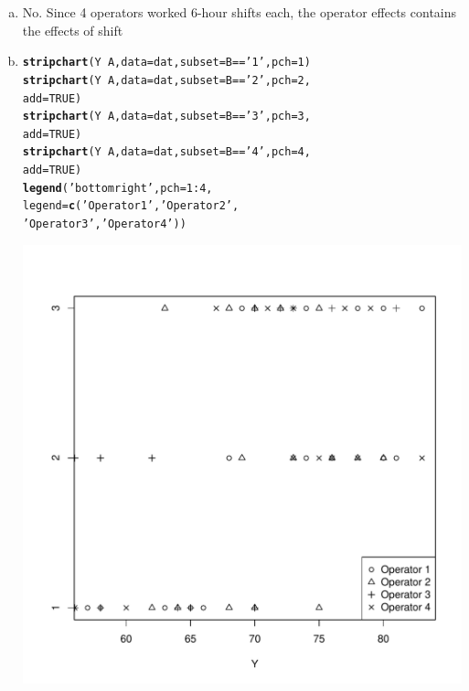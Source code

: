 \documentclass{article}\usepackage[]{graphicx}\usepackage[]{color}
\makeatletter
\def\maxwidth{ %
  \ifdim\Gin@nat@width>\linewidth
    \linewidth
  \else
    \Gin@nat@width
  \fi
}
\newcommand{\hlnum}[1]{\textcolor[rgb]{0.686,0.059,0.569}{#1}}%
\newcommand{\hlstr}[1]{\textcolor[rgb]{0.192,0.494,0.8}{#1}}%
\newcommand{\hlopt}[1]{\textcolor[rgb]{0,0,0}{#1}}%
\newcommand{\hlstd}[1]{\textcolor[rgb]{0.345,0.345,0.345}{#1}}%
\newcommand{\hlkwc}[1]{\textcolor[rgb]{0.333,0.667,0.333}{#1}}%
\newcommand{\hlkwd}[1]{\textcolor[rgb]{0.737,0.353,0.396}{\textbf{#1}}}%
\newenvironment{kframe}{%
 \def\at@end@of@kframe{}%
 \ifinner\ifhmode%
  \def\at@end@of@kframe{\end{minipage}}%
  \begin{minipage}{\columnwidth}%
 \fi\fi%
 \def\FrameCommand##1{\hskip\@totalleftmargin \hskip-\fboxsep
 \colorbox{shadecolor}{##1}\hskip-\fboxsep
     \hskip-\linewidth \hskip-\@totalleftmargin \hskip\columnwidth}%
 \MakeFramed {\advance\hsize-\width
   \@totalleftmargin\z@ \linewidth\hsize
   \@setminipage}}%
 {\par\unskip\endMakeFramed%
 \at@end@of@kframe}
\newenvironment{knitrout}{}{} %
\makeatother
\begin{document}
\begin{enumerate}[(a)]

\item
  
\qquad No. Since 4 operators worked 6-hour shifts each, the operator effects contains the effects of shift

\item

\begin{knitrout}
\color{fgcolor}\begin{kframe}
\begin{alltt}
  \hlkwd{stripchart}\hlstd{(Y} \hlopt{~} \hlstd{A,} \hlkwc{data} \hlstd{= dat,} \hlkwc{subset} \hlstd{= B} \hlopt{==} \hlstr{'1'}\hlstd{,} \hlkwc{pch} \hlstd{=} \hlnum{1}\hlstd{)}
  \hlkwd{stripchart}\hlstd{(Y} \hlopt{~} \hlstd{A,} \hlkwc{data} \hlstd{= dat,} \hlkwc{subset} \hlstd{= B} \hlopt{==} \hlstr{'2'}\hlstd{,} \hlkwc{pch} \hlstd{=} \hlnum{2}\hlstd{,}
           \hlkwc{add} \hlstd{=} \hlnum{TRUE}\hlstd{)}
  \hlkwd{stripchart}\hlstd{(Y} \hlopt{~} \hlstd{A,} \hlkwc{data} \hlstd{= dat,} \hlkwc{subset} \hlstd{= B} \hlopt{==} \hlstr{'3'}\hlstd{,} \hlkwc{pch} \hlstd{=} \hlnum{3}\hlstd{,}
           \hlkwc{add} \hlstd{=} \hlnum{TRUE}\hlstd{)}
  \hlkwd{stripchart}\hlstd{(Y} \hlopt{~} \hlstd{A,} \hlkwc{data} \hlstd{= dat,} \hlkwc{subset} \hlstd{= B} \hlopt{==} \hlstr{'4'}\hlstd{,} \hlkwc{pch} \hlstd{=} \hlnum{4}\hlstd{,}
           \hlkwc{add} \hlstd{=} \hlnum{TRUE}\hlstd{)}
  \hlkwd{legend}\hlstd{(}\hlstr{'bottomright'}\hlstd{,} \hlkwc{pch} \hlstd{=} \hlnum{1}\hlopt{:}\hlnum{4}\hlstd{,}
       \hlkwc{legend} \hlstd{=} \hlkwd{c}\hlstd{(}\hlstr{'Operator 1'}\hlstd{,} \hlstr{'Operator 2'}\hlstd{,}
                  \hlstr{'Operator 3'}\hlstd{,} \hlstr{'Operator 4'}\hlstd{))}
\end{alltt}
\end{kframe}
\includegraphics[width=\maxwidth]{figure/unnamed-chunk-3-1} 


\end{knitrout}
\end{enumerate}
\end{document}
